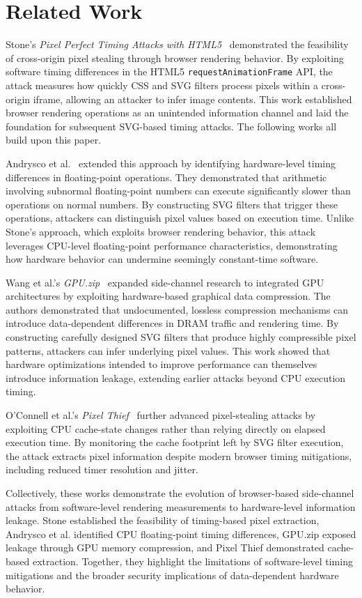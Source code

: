 \section{Related Work}
\label{sec:related_work}

Stone's \textit{Pixel Perfect Timing Attacks with HTML5}~\cite{stone2013pixel} demonstrated the feasibility of cross-origin pixel stealing through browser rendering behavior. By exploiting software timing differences in the HTML5 \texttt{requestAnimationFrame} API, the attack measures how quickly CSS and SVG filters process pixels within a cross-origin iframe, allowing an attacker to infer image contents. This work established browser rendering operations as an unintended information channel and laid the foundation for subsequent SVG-based timing attacks. The following works all build upon this paper.

Andrysco et al.~\cite{andrysco2015subnormal} extended this approach by identifying hardware-level timing differences in floating-point operations. They demonstrated that arithmetic involving subnormal floating-point numbers can execute significantly slower than operations on normal numbers. By constructing SVG filters that trigger these operations, attackers can distinguish pixel values based on execution time. Unlike Stone's approach, which exploits browser rendering behavior, this attack leverages CPU-level floating-point performance characteristics, demonstrating how hardware behavior can undermine seemingly constant-time software.

Wang et al.'s \textit{GPU.zip}~\cite{wang2024gpuzip} expanded side-channel research to integrated GPU architectures by exploiting hardware-based graphical data compression. The authors demonstrated that undocumented, lossless compression mechanisms can introduce data-dependent differences in DRAM traffic and rendering time. By constructing carefully designed SVG filters that produce highly compressible pixel patterns, attackers can infer underlying pixel values. This work showed that hardware optimizations intended to improve performance can themselves introduce information leakage, extending earlier attacks beyond CPU execution timing.

O'Connell et al.'s \textit{Pixel Thief}~\cite{oconnell2024pixelthief} further advanced pixel-stealing attacks by exploiting CPU cache-state changes rather than relying directly on elapsed execution time. By monitoring the cache footprint left by SVG filter execution, the attack extracts pixel information despite modern browser timing mitigations, including reduced timer resolution and jitter.

Collectively, these works demonstrate the evolution of browser-based side-channel attacks from software-level rendering measurements to hardware-level information leakage. Stone established the feasibility of timing-based pixel extraction, Andrysco et al. identified CPU floating-point timing differences, GPU.zip exposed leakage through GPU memory compression, and Pixel Thief demonstrated cache-based extraction. Together, they highlight the limitations of software-level timing mitigations and the broader security implications of data-dependent hardware behavior.